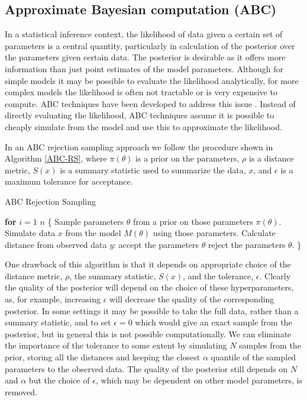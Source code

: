 \documentclass[twocolumn]{biophys}
\begin{document}
\subsection{Approximate Bayesian computation (ABC)}
In a statistical inference context, the likelihood of data given a certain set of parameters is a central quantity, particularly in calculation of the posterior over the parameters given certain data. 
The posterior is desirable as it offers more information than just point estimates of the model parameters.
Although for simple models it may be possible to evaluate the likelihood analytically, for more complex models the likelihood is often not tractable or is very expensive to compute.  
ABC techniques have been developed to address this issue \cite{beaumont2002approximate}.
Instead of directly evaluating the likelihood, ABC techniques assume it is possible to cheaply simulate from the model and use this to approximate the likelihood.

In an ABC rejection sampling approach we follow the procedure shown in Algorithm \ref{ABC-RS}, where $\pi(\theta)$ is a prior on the parameters, $\rho$ is a distance metric, $S(x)$ is a summary statistic used to summarize the data, $x$, and $\epsilon$ is a maximum tolerance for acceptance. 
\begin{algorithm}
\caption{ABC Rejection Sampling}\label{ABC-RS}
\begin{algorithmic}[1]
\State \textbf{for} $i=1$  $n$  \{
\State Sample parameters $\theta$ from a prior on those parameters $\pi (\theta)$. 
\State Simulate data $x$ from the model $M(\theta)$ using those parameters. 
\State Calculate distance from observed data $y$: 
 accept the parameters $\theta$
\Else \hspace{2pt} reject the parameters $\theta$.
\EndIf
\State \}
\end{algorithmic}
\end{algorithm}

One drawback of this algorithm is that it depends on appropriate choice of the distance metric, $\rho$, the summary statistic, $S(x)$, and the tolerance, $\epsilon $. 
Clearly the quality of the posterior will depend on the choice of these hyperparameters, as, for example, increasing $\epsilon $ will decrease the quality of the corresponding posterior.
In some settings it may be possible to take the full data, rather than a summary statistic, and to set $\epsilon=0$ which would give an exact sample from the posterior, but in general this is not possible computationally. 
We can eliminate the importance of the tolerance to some extent by simulating $N$ samples from the prior, storing all the distances and keeping the closest $\alpha$ quantile of the sampled parameters to the observed data. 
The quality of the posterior still depends on $N$ and $\alpha$ but the choice of $\epsilon $, which may be dependent on other model parameters, is removed. 
\end{document}
